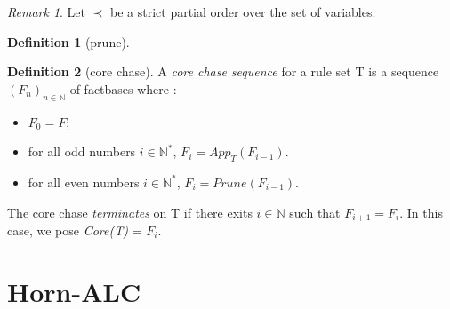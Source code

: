 \documentclass{article}
\theoremstyle{proposal}
\theoremstyle{definition}
\newtheorem{definition}{Definition}[section]
\theoremstyle{theorem}
\theoremstyle{example}
\theoremstyle{remark}
\newtheorem{remark}{Remark}[section]
\def \N {\mathbb N}
\begin{document}
\begin{remark} Let $\prec$ be a strict partial order over the set of variables.
\end{remark}

\begin{definition}[prune]


\end{definition} 

\begin{definition}[core chase]
A \emph{core chase sequence} for a rule set T is a sequence $(F_n)_{n \in \N}$ of factbases where : 
\begin{itemize}
\item $F_0 = F$;
\item for all odd numbers $i \in \N^*$, $F_i = App_T(F_{i-1})$.
\item for all even numbers $i \in \N^*$, $F_i = Prune(F_{i-1})$.
\end{itemize}
The core chase \emph{terminates} on T if there exits $i \in \N$ such that $F_{i+1} = F_i$. In this case, we pose \emph{Core(T)} = $F_i$.
\end{definition} 

\section{Horn-ALC}
\end{document}
